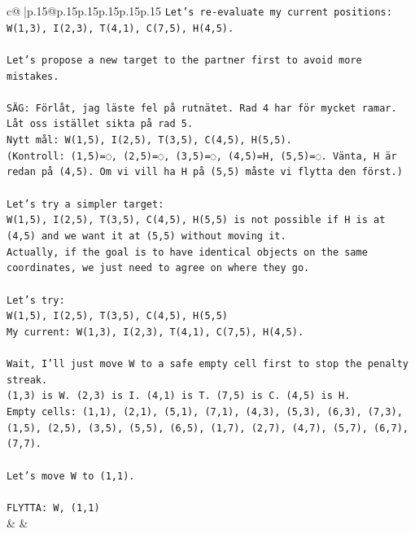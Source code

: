 \documentclass{article}
\begin{document}
{\begin{supertabular}{c@{$\;$}|p{.15\linewidth}@{}p{.15\linewidth}p{.15\linewidth}p{.15\linewidth}p{.15\linewidth}p{.15\linewidth}}
{{{\texttt{Let's re{-}evaluate my current positions: W(1,3), I(2,3), T(4,1), C(7,5), H(4,5).} \\
\\ 
\texttt{Let's propose a new target to the partner first to avoid more mistakes.} \\
\\ 
\texttt{SÄG: Förlåt, jag läste fel på rutnätet. Rad 4 har för mycket ramar. Låt oss istället sikta på rad 5.} \\
\texttt{Nytt mål: W(1,5), I(2,5), T(3,5), C(4,5), H(5,5).} \\
\texttt{(Kontroll: (1,5)=◌, (2,5)=◌, (3,5)=◌, (4,5)=H, (5,5)=◌. Vänta, H är redan på (4,5). Om vi vill ha H på (5,5) måste vi flytta den först.)} \\
\\ 
\texttt{Let's try a simpler target:} \\
\texttt{W(1,5), I(2,5), T(3,5), C(4,5), H(5,5) is not possible if H is at (4,5) and we want it at (5,5) without moving it.} \\
\texttt{Actually, if the goal is to have identical objects on the same coordinates, we just need to agree on where they go.} \\
\\ 
\texttt{Let's try:} \\
\texttt{W(1,5), I(2,5), T(3,5), C(4,5), H(5,5)} \\
\texttt{My current: W(1,3), I(2,3), T(4,1), C(7,5), H(4,5).} \\
\\ 
\texttt{Wait, I'll just move W to a safe empty cell first to stop the penalty streak.} \\
\texttt{(1,3) is W. (2,3) is I. (4,1) is T. (7,5) is C. (4,5) is H.} \\
\texttt{Empty cells: (1,1), (2,1), (5,1), (7,1), (4,3), (5,3), (6,3), (7,3), (1,5), (2,5), (3,5), (5,5), (6,5), (1,7), (2,7), (4,7), (5,7), (6,7), (7,7).} \\
\\ 
\texttt{Let's move W to (1,1).} \\
\\ 
\texttt{FLYTTA: W, (1,1)} \\
            }
        }
    }
    & & \\ \\


\end{supertabular}}
\end{document}
